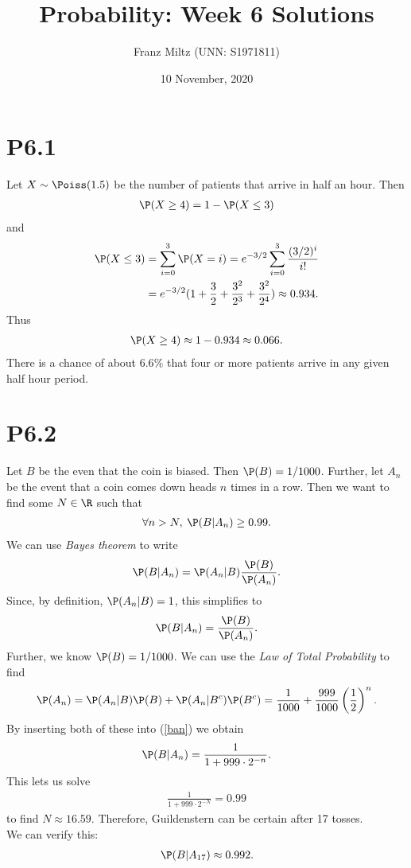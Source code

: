 \documentclass{article}
\begin{document}
\title{Probability: Week 6 Solutions}
\author{Franz Miltz (UNN: S1971811)}
\date{10 November, 2020}
\maketitle


\section*{P6.1}


Let $X\sim\Poiss(1.5)$ be the number of patients that arrive in half an hour. Then
\begin{align*}
  \P(X \geq 4) = 1 - \P(X \leq 3)
\end{align*}
and
\begin{align*}
  \P(X \leq 3) &= \sum_{i=0}^3 \P(X=i)=e^{-3/2}\sum_{i=0}^3 \frac{(3/2)^i}{i!}\\
  &=e^{-3/2} (1+\frac{3}{2}+\frac{3^2}{2^3}+\frac{3^2}{2^4})
  \approx 0.934.
\end{align*}
Thus
\begin{align*}
  \P(X\geq 4) \approx 1 - 0.934 \approx 0.066.
\end{align*}
There is a chance of about $6.6\%$ that four or more patients arrive in
any given half hour period.


\section*{P6.2}


Let $B$ be the even that the coin is biased. Then $\P(B)=1/1000$. Further,
let $A_n$ be the event that a coin comes down heads $n$ times in a row.
Then we want to find some $N\in\R$ such that
\begin{align*}
  \forall n > N,\: \P(B|A_n)\geq 0.99.
\end{align*}
We can use \emph{Bayes theorem} to write
\begin{align*}
  \P(B|A_n) = \P(A_n|B)\frac{\P(B)}{\P(A_n)}.
\end{align*}
Since, by definition, $\P(A_n|B)=1$, this simplifies to
\begin{align}
  \label{ban}
  \P(B|A_n) = \frac{\P(B)}{\P(A_n)}.
\end{align}
Further, we know $\P(B)=1/1000$. We can use the \emph{Law of Total
Probability} to find
\begin{align*}
  \P(A_n)=\P(A_n|B)\P(B) + \P(A_n|B^c)\P(B^c)
  =\frac{1}{1000}+\frac{999}{1000}\left(\frac{1}{2}\right)^n.
\end{align*}
By inserting both of these into (\ref{ban}) we obtain
\begin{align*}
  \P(B|A_n) = \frac{1}{1+999\cdot 2^{-n}}.
\end{align*}
This lets us solve
\begin{align*}
  \frac{1}{1+999\cdot 2^{-N}} = 0.99
\end{align*}
to find $N\approx 16.59$. Therefore, Guildenstern can be certain after
17 tosses.\\
We can verify this:
\begin{align*}
  \P(B|A_{17}) \approx 0.992.
\end{align*}
\end{document}
